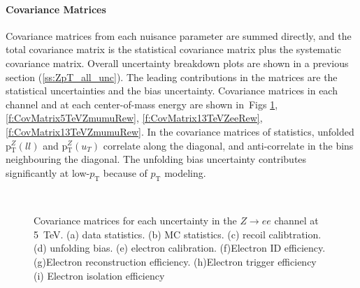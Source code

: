 \clearpage

\paragraph{Covariance Matrices}


Covariance matrices from each nuisance parameter are summed directly, and the total covariance matrix is the statistical covariance matrix plus the systematic covariance matrix.
Overall uncertainty breakdown plots are shown in a previous section (\ref{ss:ZpT_all_unc}). The leading contributions in the matrices are the statistical uncertainties and the bias uncertainty.
Covariance matrices in each channel and at each center-of-mass energy are shown in~Figs \ref{f:CovMatrix5TeVZeeRew}, \ref{f:CovMatrix5TeVZmumuRew}, \ref{f:CovMatrix13TeVZeeRew}, \ref{f:CovMatrix13TeVZmumuRew}.
In the covariance matrices of statistics, unfolded p$_{\mathrm{T}}^{Z}(ll)$ and p$_\mathrm{T}^{Z}(u_T)$ correlate along the diagonal,
and anti-correlate in the bins neighbouring the diagonal.
The unfolding bias uncertainty contributes significantly at low-$p_\mathrm{T}$ because of $p_\mathrm{T}$ modeling.

\begin{figure}[h]
\centering
{}
\\
\caption{Covariance matrices for each uncertainty in the $Z\rightarrow ee$ channel at 5~TeV. (a) data statistics. (b) MC statistics. (c) recoil calibtration. (d) unfolding bias. (e) electron calibration. (f)Electron ID efficiency. (g)Electron reconstruction efficiency. (h)Electron trigger efficiency (i) Electron isolation efficiency }
\label{f:CovMatrix5TeVZeeRew}
\end{figure}

